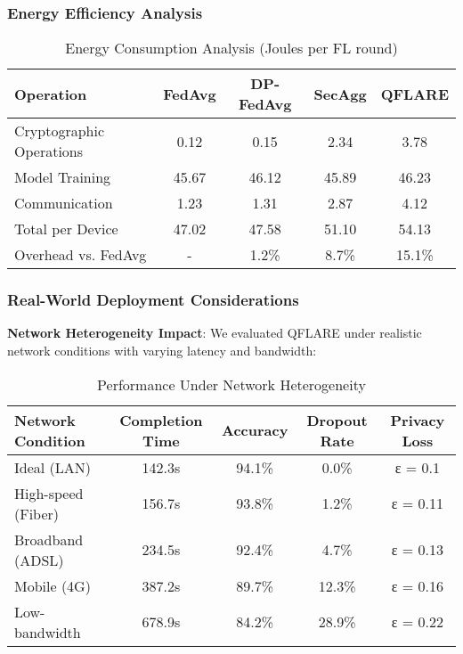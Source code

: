 \documentclass[journal,onecolumn,draftclsnofoot]{IEEEtran}
\begin{document}
\subsubsection{Energy Efficiency Analysis}

\begin{table}[h]
\centering
\caption{Energy Consumption Analysis (Joules per FL round)}
\begin{tabular}{|l|c|c|c|c|}
\hline
\textbf{Operation} & \textbf{FedAvg} & \textbf{DP-FedAvg} & \textbf{SecAgg} & \textbf{QFLARE} \\
\hline
Cryptographic Operations & 0.12 & 0.15 & 2.34 & 3.78 \\
Model Training & 45.67 & 46.12 & 45.89 & 46.23 \\
Communication & 1.23 & 1.31 & 2.87 & 4.12 \\
Total per Device & 47.02 & 47.58 & 51.10 & 54.13 \\
Overhead vs. FedAvg & - & 1.2\% & 8.7\% & 15.1\% \\
\hline
\end{tabular}
\end{table}

\subsubsection{Real-World Deployment Considerations}

\textbf{Network Heterogeneity Impact}:
We evaluated QFLARE under realistic network conditions with varying latency and bandwidth:

\begin{table}[h]
\centering
\caption{Performance Under Network Heterogeneity}
\begin{tabular}{|l|c|c|c|c|}
\hline
\textbf{Network Condition} & \textbf{Completion Time} & \textbf{Accuracy} & \textbf{Dropout Rate} & \textbf{Privacy Loss} \\
\hline
Ideal (LAN) & 142.3s & 94.1\% & 0.0\% & ε = 0.1 \\
High-speed (Fiber) & 156.7s & 93.8\% & 1.2\% & ε = 0.11 \\
Broadband (ADSL) & 234.5s & 92.4\% & 4.7\% & ε = 0.13 \\
Mobile (4G) & 387.2s & 89.7\% & 12.3\% & ε = 0.16 \\
Low-bandwidth & 678.9s & 84.2\% & 28.9\% & ε = 0.22 \\
\hline
\end{tabular}
\end{table}
\end{document}
